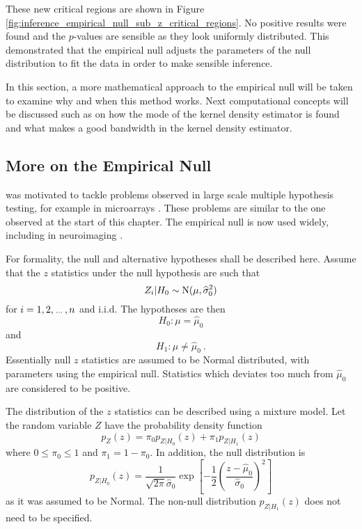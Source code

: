 These new critical regions are shown in Figure \ref{fig:inference_empirical_null_sub_z_critical_regions}. No positive results were found and the $p$-values are sensible as they look uniformly distributed. This demonstrated that the empirical null adjusts the parameters of the null distribution to fit the data in order to make sensible inference.

In this section, a more mathematical approach to the empirical null will be taken to examine why and when this method works. Next computational concepts will be discussed such as on how the mode of the kernel density estimator is found and what makes a good bandwidth in the kernel density estimator. 


\subsection{More on the Empirical Null}

\cite{efron2004large} was motivated to tackle problems observed in large scale multiple hypothesis testing, for example in microarrays \citep{hedenfalk2001gene, efron2002empirical, efron2003robbins}. These problems are similar to the one observed at the start of this chapter. The empirical null is now used widely, including in neuroimaging \citep{schwartzman2008false,schwartzman2009empirical}.

For formality, the null and alternative hypotheses shall be described here. Assume that the $z$ statistics under the null hypothesis are such that
\begin{equation}
	Z_i|H_0\sim\operatorname{N}(\mu,\widehat{\sigma}_0^2)
\end{equation}
for $i=1,2,\dotdotdot,n$ and i.i.d. The hypotheses are then
\begin{equation}
	H_0:\mu = \widehat{\mu}_0
\end{equation}
and
\begin{equation}
	H_1:\mu\neq\widehat{\mu}_0
	\ .
\end{equation}
Essentially null $z$ statistics are assumed to be Normal distributed, with parameters using the empirical null. Statistics which deviates too much from $\widehat{\mu}_0$ are considered to be positive.

The distribution of the $z$ statistics can be described using a mixture model. Let the random variable $Z$ have the probability density function
\begin{equation}
	p_Z(z) =
	\pi_0 p_{Z|H_0}(z) + \pi_1 p_{Z|H_1}(z)
\end{equation}
where $0\leqslant\pi_0\leqslant 1$ and  $\pi_1 = 1-\pi_0$. In addition, the null distribution is
\begin{equation}
	p_{Z|H_0}(z) = 
	\dfrac{1}{\sqrt{2\pi}\widehat{\sigma}_0}
	\exp\left[
		-\dfrac{1}{2}
		\left(
			\dfrac{z-\widehat{\mu}_0}{\widehat{\sigma}_0}
		\right)^2
	\right]
\end{equation}
as it was assumed to be Normal. The non-null distribution $p_{Z|H_1}(z)$ does not need to be specified.

